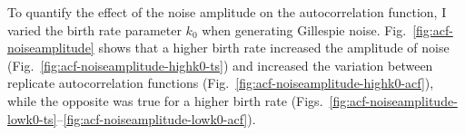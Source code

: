 





To quantify the effect of the noise amplitude on the autocorrelation function, I varied the birth rate parameter $k_{0}$ when generating Gillespie noise.
Fig.\ \ref{fig:acf-noiseamplitude} shows that a higher birth rate increased the amplitude of noise (Fig.\ \ref{fig:acf-noiseamplitude-highk0-ts}) and increased the variation between replicate autocorrelation functions (Fig.\ \ref{fig:acf-noiseamplitude-highk0-acf}), while the opposite was true for a higher birth rate (Figs.\ \ref{fig:acf-noiseamplitude-lowk0-ts}--\ref{fig:acf-noiseamplitude-lowk0-acf}).

